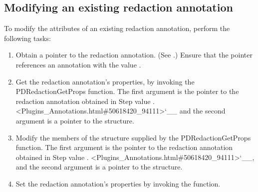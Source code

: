 \documentclass[letterpaper,12pt,english,openany,oneside]{sphinxmanual}
\begin{document}
\subsection{Modifying an existing redaction annotation}
\label{\detokenize{Plugins_Annotations:modifying-an-existing-redaction-annotation}}
To modify the attributes of an existing redaction annotation, perform the following tasks:
\begin{enumerate}
%
\item {} 
Obtain a pointer to the redaction annotation. (See .) Ensure that the pointer references an annotation with the  value .

\item {} 
Get the redaction annotation’s properties, by invoking the PDRedactionGetProps function. The first argument is the pointer to the redaction annotation obtained in Step  value . <Plugins\_Annotations.html\#50618420\_94111>`\_\_ and the second argument is a pointer to the  structure.

\item {} 
Modify the members of the  structure supplied by the PDRedactionGetProps function. The first argument is the pointer to the redaction annotation obtained in Step  value . <Plugins\_Annotations.html\#50618420\_94111>`\_\_, and the second argument is a pointer to the  structure.

\item {} 
Set the redaction annotation’s properties by invoking the  function.

\end{enumerate}
\end{document}
